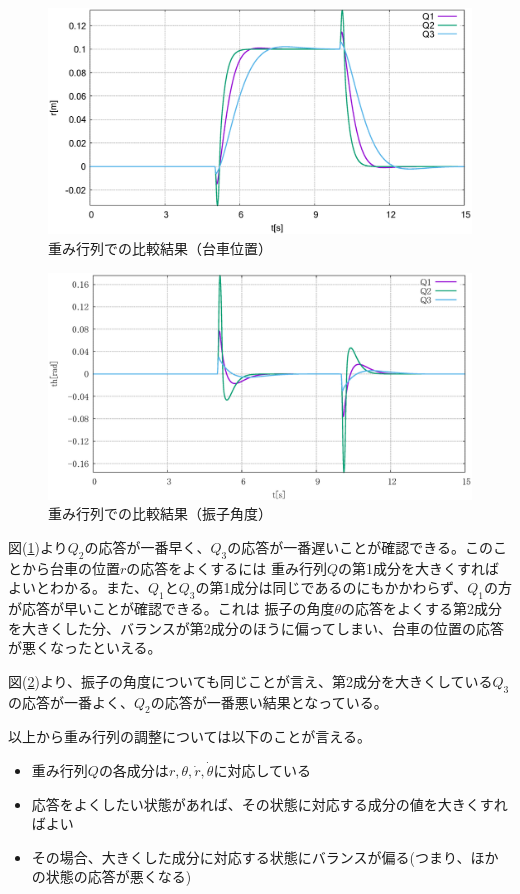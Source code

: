 	\begin{figure}[H]
		\centering
		\includegraphics[width=0.8\linewidth]{gazo/simulation_QRF_compare_R.eps}
		\caption{重み行列での比較結果（台車位置）}
		\label{image:simulation_QRF_r}
	\end{figure}
	\begin{figure}[H]
		\centering
		\includegraphics[width=0.8\linewidth]{gazo/simulation_QRF_compare_THETA.eps}
		\caption{重み行列での比較結果（振子角度）}
		\label{image:simulation_QRF_th}
	\end{figure}
	図(\ref{image:simulation_QRF_r})より$Q_2$の応答が一番早く、$Q_3$の応答が一番遅いことが確認できる。このことから台車の位置$r$の応答をよくするには
	重み行列$Q$の第1成分を大きくすればよいとわかる。また、$Q_1$と$Q_3$の第1成分は同じであるのにもかかわらず、$Q_1$の方が応答が早いことが確認できる。これは
	振子の角度$\theta$の応答をよくする第2成分を大きくした分、バランスが第2成分のほうに偏ってしまい、台車の位置の応答が悪くなったといえる。
	\par
	図(\ref{image:simulation_QRF_th})より、振子の角度についても同じことが言え、第2成分を大きくしている$Q_3$の応答が一番よく、$Q_2$の応答が一番悪い結果となっている。
	\par
	以上から重み行列の調整については以下のことが言える。
	\begin{itemize}
	  \item 重み行列$Q$の各成分は$r,\theta,\dot{r},\dot{\theta}$に対応している
	  \item 応答をよくしたい状態があれば、その状態に対応する成分の値を大きくすればよい
	  \item その場合、大きくした成分に対応する状態にバランスが偏る(つまり、ほかの状態の応答が悪くなる)
	\end{itemize}
	
